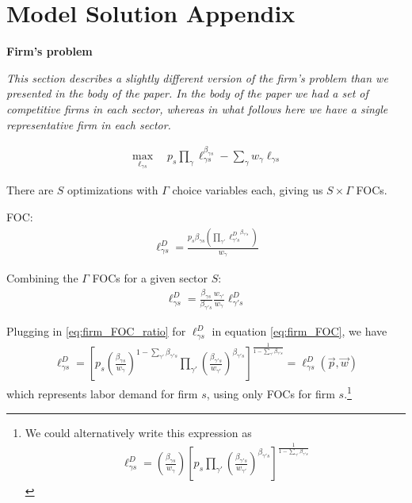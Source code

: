 \documentclass[12pt]{article}
\def\g{\gamma}
\theoremstyle{definition}
\theoremstyle{plain}
\begin{document}
\clearpage


\section{Model Solution Appendix}

\label{sec:model_solution}

\textbf{Firm's problem}


\emph{This section describes a slightly different version of the firm's problem than we presented in the body of the paper. In the body of the paper we had a set of competitive firms in each sector, whereas in what follows here we have a single representative firm in each sector. }

\begin{align}
\max_{\ell_{\g s}} \quad p_s \prod_{\g} \ell_{\g s}^{\beta_{\g s}} - \sum_{\g} w_{\g} \ell_{\g s}
\end{align}

There are $S$ optimizations with $\Gamma$ choice variables each, giving us $S \times \Gamma$ FOCs.

FOC:
\begin{align}
\ell_{\g s}^D = \frac{p_s \beta_{\g s}\left( \prod_{\g'} {\ell_{\g' s}^D}^{\beta_{\g' s}}\right)}{w_{\g}} \label{eq:firm_FOC}
\end{align}

Combining the $\Gamma$ FOCs for a given sector $S$:
\begin{align}
\ell_{\g s}^D = \frac{\beta_{\g s}}{\beta_{\g' s}}\frac{w_{\g'}}{w_{\g}} \ell_{\g's}^D \label{eq:firm_FOC_ratio}
\end{align}

Plugging in \ref{eq:firm_FOC_ratio} for $\ell_{\g s}^D$ in equation \ref{eq:firm_FOC}, we have
\begin{align}
\ell_{\g s}^D = \left[ p_s \left( \frac{\beta_{\g s}}{w_{\g }} \right)^{1-\sum_{\g'} \beta_{\g' s}} \prod_{\g'} \left(\frac{\beta_{\g' s}}{w_{\g'}} \right)^{\beta_{\g' s}} \right]^{\frac{1}{1-\sum_{\g'} \beta_{\g' s}}} = \ell_{\g s}^D \left(\vec{p}, \vec{w} \right) \label{eq:labor_demand}
\end{align}
which represents labor demand for firm $s$, using only FOCs for firm $s$.\footnote{We could alternatively write this expression as 
	\begin{align*}
	\ell_{\g s}^D =   \left( \frac{\beta_{\g s}}{w_{\g }} \right) \left[ p_s \prod_{\g'}  \left(\frac{\beta_{\g' s}}{w_{\g'}} \right)^{\beta_{\g' s}} \right]^{\frac{1}{1-\sum_{\g'} \beta_{\g' s}}}
	\end{align*}
	}
\end{document}
